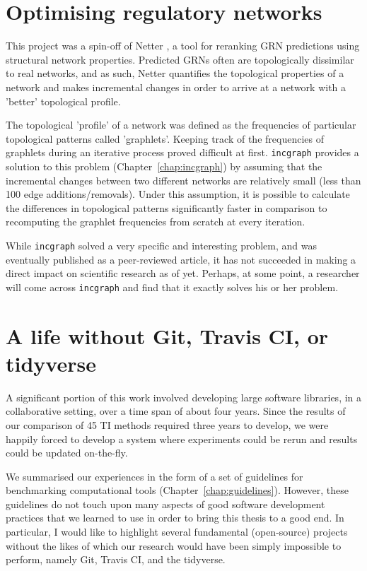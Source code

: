 \section{Optimising regulatory networks}
This project was a spin-off of Netter \cite{ruyssinck_netterrerankinggene_2016}, a tool for reranking GRN predictions using structural network properties. 
Predicted GRNs often are topologically dissimilar to real networks, and as such, Netter quantifies the topological properties of a network and makes incremental changes in order to arrive at a network with a 'better' topological profile.

The topological 'profile' of a network was defined as the frequencies of particular topological patterns called 'graphlets'. Keeping track of the frequencies of graphlets during an iterative process proved difficult at first. 
\texttt{incgraph} provides a solution to this problem (Chapter~\ref{chap:incgraph}) by  assuming that the incremental changes between two different networks are relatively small (less than 100 edge additions/removals). Under this assumption, it is possible to calculate the differences in topological patterns significantly faster in comparison to recomputing the graphlet frequencies from scratch at every iteration.

While \texttt{incgraph} solved a very specific and interesting problem, and was eventually published as a peer-reviewed article, it has not succeeded in making a direct impact on scientific research as of yet. Perhaps, at some point, a researcher will come across \texttt{incgraph} and find that it exactly solves his or her problem.



\section{A life without Git, Travis CI, or tidyverse}
A significant portion of this work involved developing large software libraries, in a collaborative setting, over a time span of about four years. Since the results of our comparison of 45 TI methods required three years to develop, we were happily forced to develop a system where experiments could be rerun and results could be updated on-the-fly.

We summarised our experiences in the form of a set of guidelines for benchmarking computational tools (Chapter~\ref{chap:guidelines}). However, these guidelines do not touch upon many aspects of good software development practices that we learned to use in order to bring this thesis to a good end. In particular, I would like to highlight several  fundamental (open-source) projects without the likes of which our research would have been simply impossible to perform, namely Git, Travis CI, and the tidyverse.

